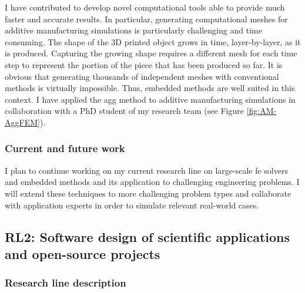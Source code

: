 \documentclass{article}
\begin{document}
I have contributed to develop novel computational tools able to provide much faster and accurate results. In particular, generating computational meshes for additive manufacturing simulations is particularly challenging and time consuming. The shape of the 3D printed object grows in time, layer-by-layer, as it is produced. Capturing the growing shape requires a different mesh for each time step to represent the portion of the piece that has been produced so far. It is obvious that generating thousands of independent meshes with conventional methods is virtually impossible.  Thus, embedded methods are well suited in this context. {{I have applied the \ac{agg} method to additive manufacturing simulations}} in collaboration with a PhD student of my research team (see Figure \ref{fig:AM-AggFEM}). %

\subsubsection{Current and future work}

 I plan to continue working on my current research line on large-scale \ac{fe} solvers and embedded  methods and its application to challenging engineering problems. I will extend these techniques to more challenging problem types and collaborate with application experts in order to simulate relevant real-world cases.
 
 

\subsection{RL2: Software design of scientific applications and open-source projects}

\subsubsection{Research line description}
\end{document}
